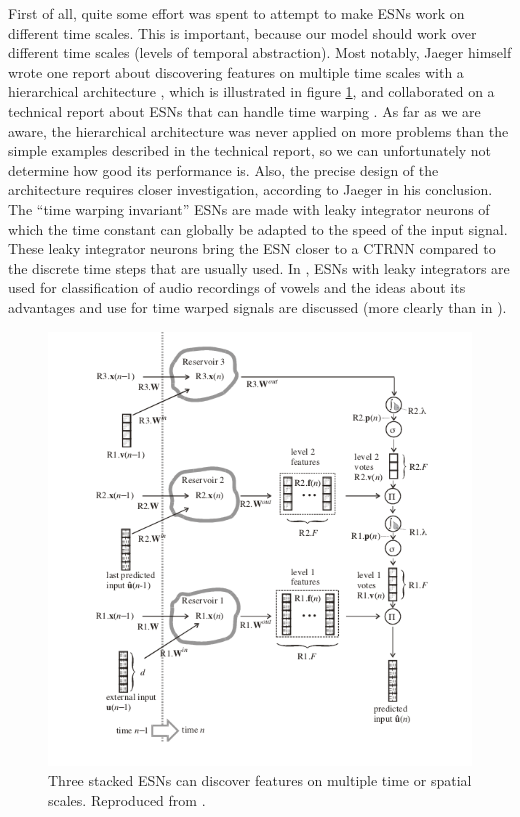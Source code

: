 \documentclass[10pt,a4paper]{report}
\begin{document}
First of all, quite some effort was spent to attempt to make ESNs work on different time scales. This is important, because our model should work over different time scales (levels of temporal abstraction). Most notably, Jaeger himself wrote one report about discovering features on multiple time scales with a hierarchical architecture \citep{Jaeger2007}, which is illustrated in figure \ref{hierarchicalESN}, and collaborated on a technical report about ESNs that can handle time warping \citep{Lukovsevicius2006}. As far as we are aware, the hierarchical architecture was never applied on more problems than the simple examples described in the technical report, so we can unfortunately not determine how good its performance is. Also, the precise design of the architecture requires closer investigation, according to Jaeger in his conclusion. The ``time warping invariant'' ESNs are made with leaky integrator neurons of which the time constant can globally be adapted to the speed of the input signal. These leaky integrator neurons bring the ESN closer to a CTRNN compared to the discrete time steps that are usually used. In \citet{Jaeger2007a}, ESNs with leaky integrators are used for classification of audio recordings of vowels and the ideas about its advantages and use for time warped signals are discussed (more clearly than in \citet{Lukovsevicius2006}). 

\begin{figure}[bthp]
\begin{center}
\includegraphics[scale=0.5]{figures/ESNstack.png}
\caption{Three stacked ESNs can discover features on multiple time or spatial scales. Reproduced from \citet{Jaeger2007}.}
\label{hierarchicalESN}
\end{center}
\end{figure}
\end{document}
